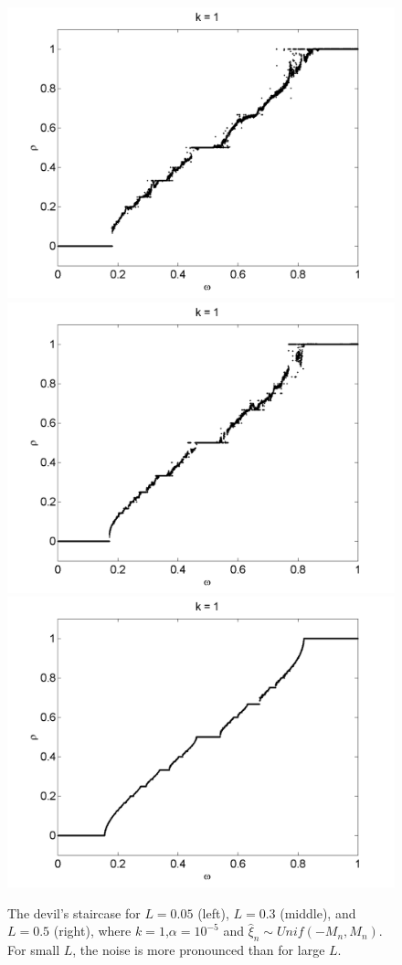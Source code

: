 \begin{figure}[H]\linespread{1}
\caption[The devil's staircase for the random circle map, varying $L$
(uniform distribution), $\alpha = 10^{-5}$]{The devil's
  staircase for $L=0.05$ (left), $L=0.3$ (middle), and $L=0.5$ (right), where $k=1$,$\alpha = 10^{-5}$ and $\hat{\xi}_n\sim Unif(-M_n,M_n)$. For small $L$, the noise is more pronounced than for large $L$.}\label{fig:randdevil1_u}
\centering
\includegraphics[width=.33\textwidth]{figs/rcirc_u_devil_k1_L005.png}\hfill
\includegraphics[width=.33\textwidth]{figs/rcirc_u_devil_k1_L01.png}\hfill
\includegraphics[width=.33\textwidth]{figs/rcirc_u_devil_k1_L05.png}
\end{figure}

